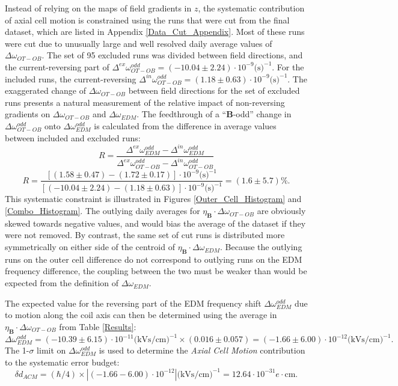 \documentclass [10pt, twoside] {uwthesis}[2012/04/02]
\begin{document}
Instead of relying on the maps of field gradients in $z$, the systematic contribution of axial cell motion is constrained using the runs that were cut from the final dataset, which are listed in Appendix \ref{Data_Cut_Appendix}. Most of these runs were cut due to unusually large and well resolved daily average values of $\Delta\omega_{OT-OB}$. The set of 95 excluded runs was divided between field directions, and the current-reversing part of $\Delta^{ex}\omega^{odd}_{OT-OB} = (-10.04\pm2.24)\cdot 10^{-9} \text{(s)}^{-1}$. For the included runs, the current-reversing $\Delta^{in}\omega^{odd}_{OT-OB} = (1.18\pm0.63)\cdot 10^{-9} \text{(s)}^{-1}$. The exaggerated change of $\Delta\omega_{OT-OB}$ between field directions for the set of excluded runs presents a natural measurement of the relative impact of non-reversing gradients on $\Delta\omega_{OT-OB}$ and $\Delta\omega_{EDM}$. The feedthrough of a ``$\mathbf{B}$-odd'' change in $\Delta\omega^{odd}_{OT-OB}$ onto $\Delta\omega^{odd}_{EDM}$ is calculated from the difference in average values between included and excluded runs:
\begin{equation}
R =\dfrac{\Delta^{ex}\omega^{odd}_{EDM} - \Delta^{in}\omega^{odd}_{EDM}}{\Delta^{ex}\omega^{odd}_{OT-OB} - \Delta^{in}\omega^{odd}_{OT-OB}}
\end{equation}
\begin{equation}
R =\dfrac{[(1.58\pm0.47) - (1.72\pm0.17)]\cdot 10^{-9} \text{(s)}^{-1}}{[(-10.04\pm2.24) - (1.18\pm0.63)]\cdot 10^{-9} \text{(s)}^{-1}} = (1.6\pm5.7)\text{\%}.
\end{equation}
This systematic constraint is illustrated in Figures \ref{Outer_Cell_Histogram} and \ref{Combo_Histogram}. The outlying daily averages for $\eta_{\mathbf{B}}\cdot\Delta\omega_{OT-OB}$ are obviously skewed towards negative values, and would bias the average of the dataset if they were not removed. By contrast, the same set of cut runs is distributed more symmetrically on either side of the centroid of $\eta_{\mathbf{B}}\cdot\Delta\omega_{EDM}$. Because the outlying runs on the outer cell difference do not correspond to outlying runs on the EDM frequency difference, the coupling between the two must be weaker than would be expected from the definition of $\Delta\omega_{EDM}$. 

The expected value for the reversing part of the EDM frequency shift $\Delta\omega^{odd}_{EDM}$ due to motion along the coil axis can then be determined using the average in $\eta_{\mathbf{B}}\cdot\Delta\omega_{OT-OB}$ from Table \ref{Results}:
\begin{equation}
\Delta\omega^{odd}_{EDM} = (-10.39 \pm 6.15)\cdot 10^{-11}\text{(kVs/cm)}^{-1} \times (0.016 \pm 0.057) = (-1.66 \pm 6.00)\cdot 10^{-12}\text{(kVs/cm)}^{-1}.
\end{equation}
The 1-$\sigma$ limit on $\Delta\omega^{odd}_{EDM}$ is used to determine the \textit{Axial Cell Motion} contribution to the systematic error budget:
\begin{equation}
\delta d_{ACM} = (\hbar/4)\times |(-1.66 - 6.00)\cdot 10^{-12}|\text{(kVs/cm)}^{-1} = 12.64\cdot 10^{-31} e\cdot \text{cm}.
\end{equation} 
\end{document}
